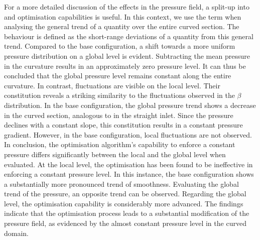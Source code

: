 For a more detailed discussion of the effects in the pressure field, a split-up into  and  optimisation capabilities is useful.
In this context, we use the term   when analysing the general trend of a quantity over the entire curved section.
The  behaviour  is defined as  the short-range deviations of a quantity from this general trend.
Compared to the base configuration, a shift towards a more uniform pressure distribution on a global level is evident.
Subtracting the mean pressure in the curvature results in an approximately zero pressure level. 
It can thus be concluded that  the global pressure level remains constant along the entire curvature.
In contrast,  fluctuations are visible on the local level.
Their constitution reveals a striking similarity  to the fluctuations observed in the $\beta$ distribution.
In the base configuration, the global pressure trend shows a decrease in the curved section, analogous to in the straight inlet.
Since the pressure declines with a constant slope, this constitution results in a constant pressure gradient.
However, in the base configuration, local fluctuations are not observed.
In conclusion,  the optimisation algorithm's  capability to enforce a constant pressure differs significantly between the local and the global level when evaluated.
At the local level, the optimisation has been found to be ineffective in enforcing a constant pressure level.
In this instance,  the base configuration shows  a substantially more pronounced trend of smoothness.
Evaluating the global trend of the pressure, an opposite trend can be observed.
Regarding the global level, the optimisation capability is considerably more advanced.
The findings indicate that the optimisation process leads to a substantial modification of the pressure field, as evidenced by the almost constant pressure level in the curved domain.


